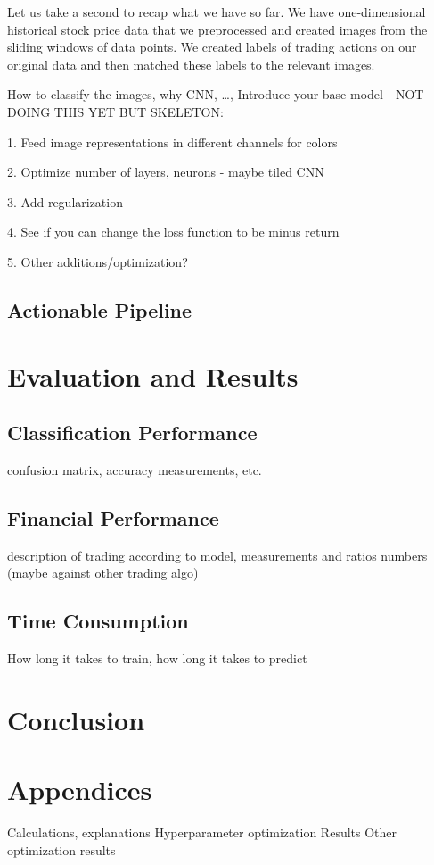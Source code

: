 \documentclass[11pt, a4paper]{article}
\begin{document}
Let us take a second to recap what we have so far. We have one-dimensional historical stock price data that we preprocessed and created images from the sliding windows of data points. We created 
labels of trading actions on our original data and then matched these labels to the relevant images. 

How to classify the images, why CNN, \dots, 
Introduce your base model - NOT DOING THIS YET BUT SKELETON:

1. Feed image representations in different channels for colors

2. Optimize number of layers, neurons - maybe tiled CNN

3. Add regularization

4. See if you can change the loss function to be minus return

5. Other additions/optimization?

\subsection{Actionable Pipeline}

\section{Evaluation and Results}

\subsection{Classification Performance}
confusion matrix, accuracy measurements, etc.

\subsection{Financial Performance}
description of trading according to model, measurements and ratios
numbers (maybe against other trading algo)

\subsection{Time Consumption}
How long it takes to train, how long it takes to predict

\section{Conclusion}

\section{Appendices}
Calculations, explanations
Hyperparameter optimization Results
Other optimization results



\end{document}
